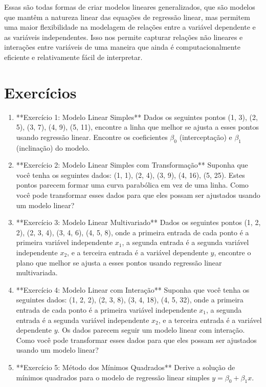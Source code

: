 \documentclass[12pt,a4paper, brazil]{article}
\begin{document}
Essas são todas formas de criar modelos lineares generalizados, que são modelos que mantêm a natureza linear das equações de regressão linear, mas permitem uma maior flexibilidade na modelagem de relações entre a variável dependente e as variáveis independentes. Isso nos permite capturar relações não lineares e interações entre variáveis de uma maneira que ainda é computacionalmente eficiente e relativamente fácil de interpretar.

\section{Exercícios}

\begin{enumerate}
  \item **Exercício 1: Modelo Linear Simples**  
  Dados os seguintes pontos (1, 3), (2, 5), (3, 7), (4, 9), (5, 11), encontre a linha que melhor se ajusta a esses pontos usando regressão linear. Encontre os coeficientes $\beta_0$ (interceptação) e $\beta_1$ (inclinação) do modelo.

\item  **Exercício 2: Modelo Linear Simples com Transformação**  
   Suponha que você tenha os seguintes dados: (1, 1), (2, 4), (3, 9), (4, 16), (5, 25). Estes pontos parecem formar uma curva parabólica em vez de uma linha. Como você pode transformar esses dados para que eles possam ser ajustados usando um modelo linear?

   \item  **Exercício 3: Modelo Linear Multivariado**  
   Dados os seguintes pontos (1, 2, 2), (2, 3, 4), (3, 4, 6), (4, 5, 8), onde a primeira entrada de cada ponto é a primeira variável independente $x_1$, a segunda entrada é a segunda variável independente $x_2$, e a terceira entrada é a variável dependente $y$, encontre o plano que melhor se ajusta a esses pontos usando regressão linear multivariada. 

   \item  **Exercício 4: Modelo Linear com Interação**  
   Suponha que você tenha os seguintes dados: (1, 2, 2), (2, 3, 8), (3, 4, 18), (4, 5, 32), onde a primeira entrada de cada ponto é a primeira variável independente $x_1$, a segunda entrada é a segunda variável independente $x_2$, e a terceira entrada é a variável dependente $y$. Os dados parecem seguir um modelo linear com interação. Como você pode transformar esses dados para que eles possam ser ajustados usando um modelo linear?

   \item  **Exercício 5: Método dos Mínimos Quadrados**  
   Derive a solução de mínimos quadrados para o modelo de regressão linear simples $y = \beta_0 + \beta_1x$.

\end{enumerate}
\end{document}
